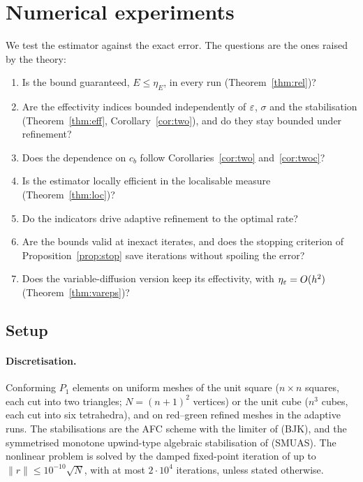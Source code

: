 
\section{Numerical experiments}\label{sec:num}

We test the estimator against the exact error. The questions are the ones raised by the theory:
\begin{enumerate}[label=(Q\arabic*)]
  \item Is the bound guaranteed, $E\le\eta_E$, in every run (Theorem~\ref{thm:rel})?
  \item Are the effectivity indices bounded independently of $\varepsilon$, $\sigma$ and the stabilisation
  (Theorem~\ref{thm:eff}, Corollary~\ref{cor:two}), and do they stay bounded under refinement?
  \item Does the dependence on $c_b$ follow Corollaries~\ref{cor:two} and~\ref{cor:twoc}?
  \item Is the estimator locally efficient in the localisable measure (Theorem~\ref{thm:loc})?
  \item Do the indicators drive adaptive refinement to the optimal rate?
  \item Are the bounds valid at inexact iterates, and does the stopping criterion of
  Proposition~\ref{prop:stop} save iterations without spoiling the error?
  \item Does the variable-diffusion version keep its effectivity, with $\eta_\varepsilon=O(h^2)$
  (Theorem~\ref{thm:vareps})?
\end{enumerate}

\subsection{Setup}

\paragraph{Discretisation.} Conforming $P_1$ elements on uniform meshes of the unit square
($n\times n$ squares, each cut into two triangles; $N=(n+1)^2$ vertices) or the unit cube ($n^3$
cubes, each cut into six tetrahedra), and on red--green refined meshes in the adaptive runs. The
stabilisations are the AFC scheme with the limiter of \cite{BJK17} (BJK), and the symmetrised
monotone upwind-type algebraic stabilisation of \cite{Kn23} (SMUAS). The nonlinear problem is solved
by the damped fixed-point iteration of \cite{AJ27} up to $\|r\|\le10^{-10}\sqrt N$, with at most
$2\cdot10^4$ iterations, unless stated otherwise.

